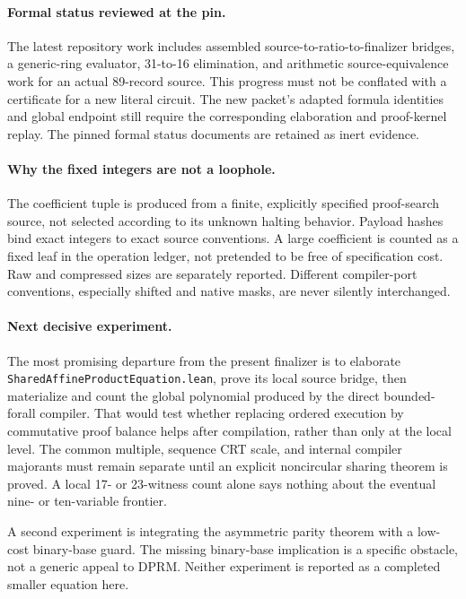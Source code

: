 \paragraph{Formal status reviewed at the pin.}
The latest repository work includes assembled source-to-ratio-to-finalizer
bridges, a generic-ring evaluator, 31-to-16 elimination, and arithmetic
source-equivalence work for an actual 89-record source. This progress
must not be conflated with a certificate for a new literal circuit.
The new packet's adapted formula identities and global endpoint still
require the corresponding elaboration and proof-kernel replay. The
pinned formal status documents are retained as inert evidence.

\paragraph{Why the fixed integers are not a loophole.}
The coefficient tuple is produced from a finite, explicitly specified
proof-search source, not selected according to its unknown halting
behavior. Payload hashes bind exact integers to exact source conventions.
A large coefficient is counted as a fixed leaf in the operation ledger,
not pretended to be free of specification cost. Raw and compressed sizes
are separately reported. Different compiler-port conventions, especially
shifted and native masks, are never silently interchanged.

\paragraph{Next decisive experiment.}
The most promising departure from the present finalizer is to elaborate
\texttt{SharedAffineProductEquation.lean}, prove its local source bridge,
then materialize and count the global polynomial produced by the direct
bounded-forall compiler. That would test whether replacing ordered
execution by commutative proof balance helps after compilation, rather
than only at the local level. The common multiple, sequence CRT scale,
and internal compiler majorants must remain separate until an explicit
noncircular sharing theorem is proved. A local 17- or 23-witness count
alone says nothing about the eventual nine- or ten-variable frontier.

A second experiment is integrating the asymmetric parity theorem with
a low-cost binary-base guard. The missing binary-base implication is a
specific obstacle, not a generic appeal to DPRM. Neither experiment is
reported as a completed smaller equation here.
